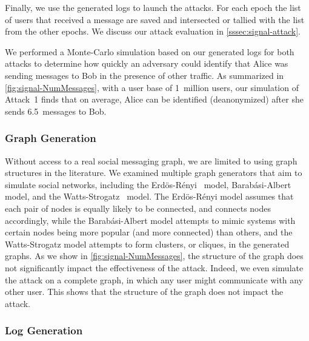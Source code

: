 Finally, we use the generated logs to launch the attacks. For each epoch the
list of users that received a message are saved and intersected or tallied with
the list from the other epochs. We discuss our attack evaluation in
\cref{sssec:signal-attack}.



We performed a Monte-Carlo simulation based on our generated logs for both
attacks to determine how quickly an adversary could identify that Alice was
sending messages to Bob in the presence of other traffic.
As summarized in \cref{fig:signal-NumMessages}, with a user base of 1~million
users, our simulation of Attack~1 finds that on average, Alice can be identified
(deanonymized) after she sends 6.5~messages to Bob.

\FigIdentifySender

\subsubsection{Graph Generation}
\label{sssec:signal-graphgeneration}

Without access to a real social messaging graph, we are limited to using graph
structures in the literature. 
We examined multiple graph generators that aim to
simulate social networks, including the
Erd{\"o}s-R{\'e}nyi~\cite{erdos1959random} model,
Barab{\'a}si-Albert~\cite{albert2002statistical} model, and the
Watts-Strogatz~\cite{watts1998collective} model. The Erd{\"o}s-R{\'e}nyi model
assumes that each pair of nodes is equally likely to be connected, and connects
nodes accordingly, while the Barab{\'a}si-Albert model attempts to mimic systems
with certain nodes being more popular (and more connected) than others, and the
Watts-Strogatz model attempts to form clusters, or cliques, in the generated
graphs. As we show in \cref{fig:signal-NumMessages}, the structure of the graph
does not significantly impact the effectiveness of the attack. Indeed, we even
simulate the attack on a complete graph, in which any user might communicate
with any other user. This shows that the structure of the graph does not impact
the attack.

\subsubsection{Log Generation}
\label{sssec:signal-loggeneration}


